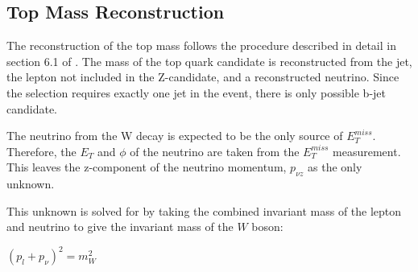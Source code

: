 

\subsection{Top Mass Reconstruction}
\label{subsec:topMass}

 The reconstruction of the top mass follows the procedure described in detail in section 6.1 of \cite{ttZ_paper}. The mass of the top quark candidate is reconstructed from the jet, the lepton not included in the Z-candidate, and a reconstructed neutrino. Since the selection requires exactly one jet in the event, there is only possible b-jet candidate. 

The neutrino from the W decay is expected to be the only source of $E_T^{miss}$. Therefore, the $E_T$ and $\phi$ of the neutrino are taken from the $E_T^{miss}$ measurement. This leaves the z-component of the neutrino momentum, $p_{\nu z}$ as the only unknown.

This unknown is solved for by taking the combined invariant mass of the lepton and neutrino to give the invariant mass of the $W$ boson:

\begin{center}
   $(p_l + p_{\nu})^2 = m_W^2$ \\ 
\end{center} 

